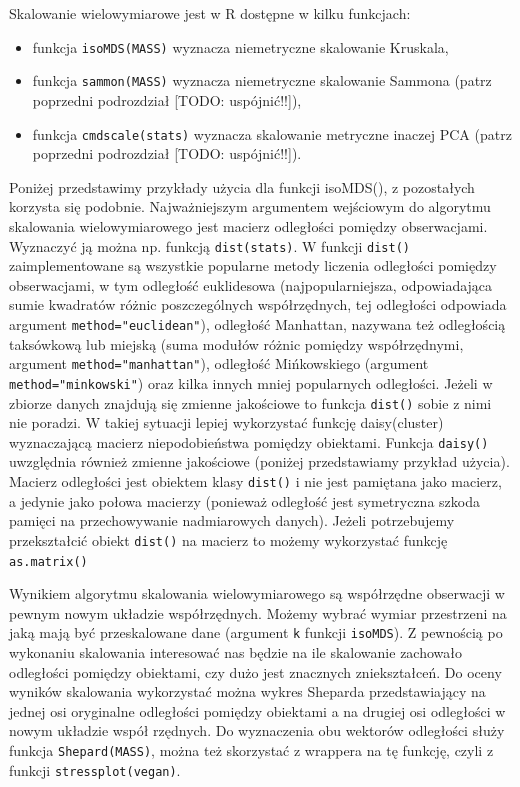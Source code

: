 \documentclass[polish,]{book}
\begin{document}
Skalowanie wielowymiarowe jest w R dostępne w kilku funkcjach:

\begin{itemize}
\item
  funkcja \texttt{isoMDS(MASS)} wyznacza niemetryczne skalowanie Kruskala,
\item
  funkcja \texttt{sammon(MASS)} wyznacza niemetryczne skalowanie Sammona (patrz
  poprzedni podrozdział {[}TODO: uspójnić!!{]}),
\item
  funkcja \texttt{cmdscale(stats)} wyznacza skalowanie metryczne inaczej PCA (patrz
  poprzedni podrozdział {[}TODO: uspójnić!!{]}).
\end{itemize}

Poniżej przedstawimy przykłady użycia dla funkcji isoMDS(), z pozostałych korzysta
się podobnie. Najważniejszym argumentem wejściowym do algorytmu skalowania wielowymiarowego jest macierz odległości pomiędzy obserwacjami. Wyznaczyć ją można np. funkcją \texttt{dist(stats)}. W funkcji \texttt{dist()} zaimplementowane są wszystkie
popularne metody liczenia odległości pomiędzy obserwacjami, w tym odległość euklidesowa (najpopularniejsza, odpowiadająca sumie kwadratów różnic poszczególnych współrzędnych, tej odległości odpowiada argument \texttt{method="euclidean"}), odległość Manhattan, nazywana też odległością taksówkową lub miejską (suma modułów różnic pomiędzy współrzędnymi, argument \texttt{method="manhattan"}), odległość Mińkowskiego (argument \texttt{method="minkowski"})
oraz kilka innych mniej popularnych odległości. Jeżeli w zbiorze danych znajdują się
zmienne jakościowe to funkcja \texttt{dist()} sobie z nimi nie poradzi. W takiej sytuacji
lepiej wykorzystać funkcję daisy(cluster) wyznaczającą macierz niepodobieństwa
pomiędzy obiektami. Funkcja \texttt{daisy()} uwzględnia również zmienne jakościowe (poniżej przedstawiamy przykład użycia). Macierz odległości jest obiektem klasy \texttt{dist()}
i nie jest pamiętana jako macierz, a jedynie jako połowa macierzy (ponieważ odległość jest symetryczna szkoda pamięci na przechowywanie nadmiarowych danych).
Jeżeli potrzebujemy przekształcić obiekt \texttt{dist()} na macierz to możemy wykorzystać
funkcję \texttt{as.matrix()}

Wynikiem algorytmu skalowania wielowymiarowego są współrzędne obserwacji
w pewnym nowym układzie współrzędnych. Możemy wybrać wymiar przestrzeni na
jaką mają być przeskalowane dane (argument \texttt{k} funkcji \texttt{isoMDS}). Z pewnością po wykonaniu skalowania interesować nas będzie na ile skalowanie zachowało odległości pomiędzy obiektami, czy dużo jest znacznych zniekształceń. Do oceny wyników skalowania wykorzystać można wykres Sheparda przedstawiający na jednej osi oryginalne
odległości pomiędzy obiektami a na drugiej osi odległości w nowym układzie współ
rzędnych. Do wyznaczenia obu wektorów odległości służy funkcja \texttt{Shepard(MASS)},
można też skorzystać z wrappera na tę funkcję, czyli z funkcji \texttt{stressplot(vegan)}.
\end{document}
